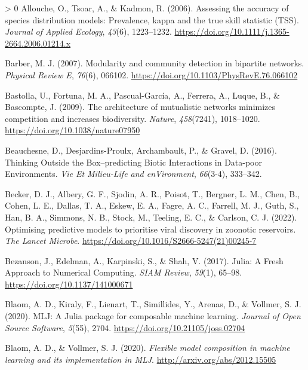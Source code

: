\documentclass[10pt,oneside]{article}
\newlength{\cslhangindent}
\newenvironment{CSLReferences}[3] %
 {%
  \setlength{\parindent}{0pt}
  \ifodd #1 \everypar{\setlength{\hangindent}{\cslhangindent}}\ignorespaces\fi
  \ifnum #2 > 0
  \setlength{\parskip}{#2\baselineskip}
  \fi
 }%
 {}
\begin{document}
\hypertarget{refs}{}
\begin{CSLReferences}{1}{0}
\leavevmode\hypertarget{ref-Allouche2006AssAcc}{}%
Allouche, O., Tsoar, A., \& Kadmon, R. (2006). Assessing the accuracy of
species distribution models: Prevalence, kappa and the true skill
statistic (TSS). \emph{Journal of Applied Ecology}, \emph{43}(6),
1223--1232. \url{https://doi.org/10.1111/j.1365-2664.2006.01214.x}

\leavevmode\hypertarget{ref-Barber2007ModCom}{}%
Barber, M. J. (2007). Modularity and community detection in bipartite
networks. \emph{Physical Review E}, \emph{76}(6), 066102.
\url{https://doi.org/10.1103/PhysRevE.76.066102}

\leavevmode\hypertarget{ref-Bastolla2009ArcMut}{}%
Bastolla, U., Fortuna, M. A., Pascual-García, A., Ferrera, A., Luque,
B., \& Bascompte, J. (2009). The architecture of mutualistic networks
minimizes competition and increases biodiversity. \emph{Nature},
\emph{458}(7241), 1018--1020. \url{https://doi.org/10.1038/nature07950}

\leavevmode\hypertarget{ref-Beauchesne2016ThiOut}{}%
Beauchesne, D., Desjardins-Proulx, Archambault, P., \& Gravel, D.
(2016). Thinking Outside the Box--predicting Biotic Interactions in
Data-poor Environments. \emph{Vie Et Milieu-Life and enVironment},
\emph{66}(3-4), 333--342.

\leavevmode\hypertarget{ref-Becker2022OptPre}{}%
Becker, D. J., Albery, G. F., Sjodin, A. R., Poisot, T., Bergner, L. M.,
Chen, B., Cohen, L. E., Dallas, T. A., Eskew, E. A., Fagre, A. C.,
Farrell, M. J., Guth, S., Han, B. A., Simmons, N. B., Stock, M.,
Teeling, E. C., \& Carlson, C. J. (2022). Optimising predictive models
to prioritise viral discovery in zoonotic reservoirs. \emph{The Lancet
Microbe}. \url{https://doi.org/10.1016/S2666-5247(21)00245-7}

\leavevmode\hypertarget{ref-Bezanson2017JulFre}{}%
Bezanson, J., Edelman, A., Karpinski, S., \& Shah, V. (2017). Julia: A
Fresh Approach to Numerical Computing. \emph{SIAM Review}, \emph{59}(1),
65--98. \url{https://doi.org/10.1137/141000671}

\leavevmode\hypertarget{ref-Blaom2020MljJul}{}%
Blaom, A. D., Kiraly, F., Lienart, T., Simillides, Y., Arenas, D., \&
Vollmer, S. J. (2020). MLJ: A Julia package for composable machine
learning. \emph{Journal of Open Source Software}, \emph{5}(55), 2704.
\url{https://doi.org/10.21105/joss.02704}

\leavevmode\hypertarget{ref-Blaom2020FleMod}{}%
Blaom, A. D., \& Vollmer, S. J. (2020). \emph{Flexible model composition
in machine learning and its implementation in MLJ}.
\url{http://arxiv.org/abs/2012.15505}


\end{CSLReferences}
\end{document}
